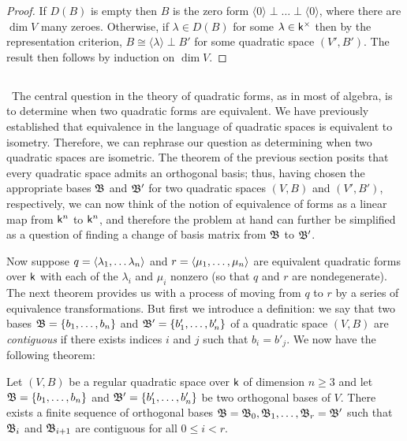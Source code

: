 \smallskip

\begin{proof}
  If \(D(B)\) is empty then \(B\) is the zero form \(\langle 0 \rangle \perp
  \dots \perp \langle 0 \rangle\), where there are \(\dim V\) many zeroes.
  Otherwise, if \(\lambda \in D(B)\) for some \(\lambda \in \mathsf{k}^{\times}\)
  then by the representation criterion, \(B \cong \langle \lambda \rangle \perp
  B'\) for some quadratic space \((V', B')\). The result then follows by
  induction on \(\dim V\).
\end{proof}

\subsection{}~The central question in the theory of quadratic forms, as in most
of algebra, is to determine when two quadratic forms are equivalent. We have
previously established that equivalence in the language of quadratic spaces is
equivalent to isometry. Therefore, we can rephrase our question as determining
when two quadratic spaces are isometric. The theorem of the previous section
posits that every quadratic space admits an orthogonal basis; thus, having
chosen the appropriate bases \(\mathfrak{B}\) and \(\mathfrak{B}'\) for two quadratic spaces
\((V, B)\) and \((V', B')\), respectively, we can now think of the notion of
equivalence of forms as a linear map from \(\mathsf{k}^n\) to \(\mathsf{k}^n\), and
therefore the problem at hand can further be simplified as a question of finding
a change of basis matrix from \(\mathfrak{B}\) to
\(\mathfrak{B}'\).\label{sec:contiguous-bases}

Now suppose \(q = \langle \lambda_1, \dots \lambda_n \rangle\) and \(r =
\langle \mu_1, \dots, \mu_n \rangle\) are equivalent quadratic forms over
\(\mathsf{k}\) with each of the \(\lambda_i\) and \(\mu_i\) nonzero (so that \(q\)
and \(r\) are nondegenerate). The next theorem provides us with a process of
moving from \(q\) to \(r\) by a series of equivalence transformations. But first
we introduce a definition: we say that two bases \(\mathfrak{B} = \{b_1, \dots,
b_n\}\) and \(\mathfrak{B}' = \{b_1', \dots, b_n'\}\) of a quadratic space \((V, B)\)
are \emph{contiguous} if there exists indices \(i\) and \(j\) such that \(b_i =
b'_j\). We now have the following theorem:

\begin{theorem}
  Let \((V, B)\) be a regular quadratic space over \(\mathsf{k}\) of dimension \(n
  \geq 3\) and let \(\mathfrak{B} = \{b_1, \dots, b_n\}\) and \(\mathfrak{B}' = \{b_1',
  \dots, b_n'\}\) be two orthogonal bases of \(V\). There exists a finite
  sequence of orthogonal bases \(\mathfrak{B} = \mathfrak{B}_0, \mathfrak{B}_1, \dots, \mathfrak{B}_r =
  \mathfrak{B}'\) such that \(\mathfrak{B}_i\) and \(\mathfrak{B}_{i+1}\) are contiguous for all
  \(0 \leq i < r\).
\end{theorem}

